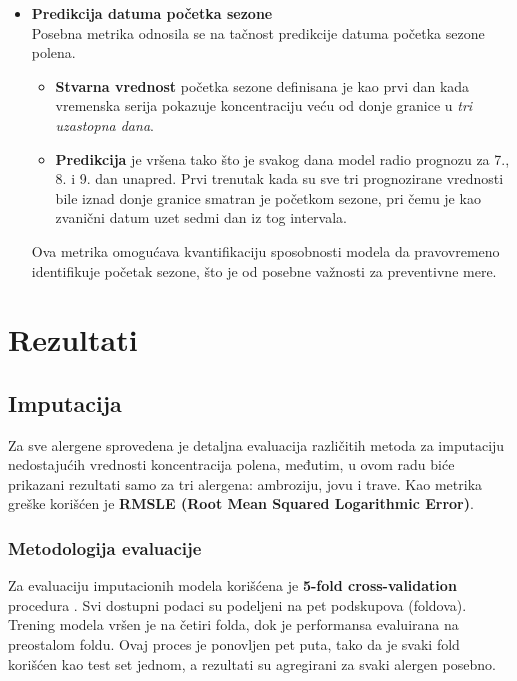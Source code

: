 \documentclass[12pt]{article}
\begin{document}
\begin{itemize}
    \item \textbf{Predikcija datuma početka sezone} \\
    Posebna metrika odnosila se na tačnost predikcije datuma početka sezone polena. 
    \begin{itemize}
        \item \textbf{Stvarna vrednost} početka sezone definisana je kao prvi dan kada vremenska serija pokazuje koncentraciju veću od donje granice u \emph{tri uzastopna dana}.
        \item \textbf{Predikcija} je vršena tako što je svakog dana model radio prognozu za 7., 8. i 9. dan unapred. Prvi trenutak kada su sve tri prognozirane vrednosti bile iznad donje granice smatran je početkom sezone, pri čemu je kao zvanični datum uzet sedmi dan iz tog intervala.
    \end{itemize}
    Ova metrika omogućava kvantifikaciju sposobnosti modela da pravovremeno identifikuje početak sezone, što je od posebne važnosti za preventivne mere.
\end{itemize}



\newpage
\section{Rezultati}

\subsection{Imputacija}

Za sve alergene sprovedena je detaljna evaluacija različitih metoda za imputaciju nedostajućih vrednosti koncentracija polena, međutim, u ovom radu biće prikazani rezultati samo za tri alergena: ambroziju, jovu i trave. Kao metrika greške korišćen je \textbf{RMSLE (Root Mean Squared Logarithmic Error)}.

\subsubsection{Metodologija evaluacije}

Za evaluaciju imputacionih modela korišćena je \textbf{5-fold cross-validation} procedura \cite{bergmeir2012use}. 
Svi dostupni podaci su podeljeni na pet podskupova (foldova). Trening modela vršen je na četiri folda, dok je performansa evaluirana na preostalom foldu. 
Ovaj proces je ponovljen pet puta, tako da je svaki fold korišćen kao test set jednom, a rezultati su agregirani za svaki alergen posebno.
\end{document}
